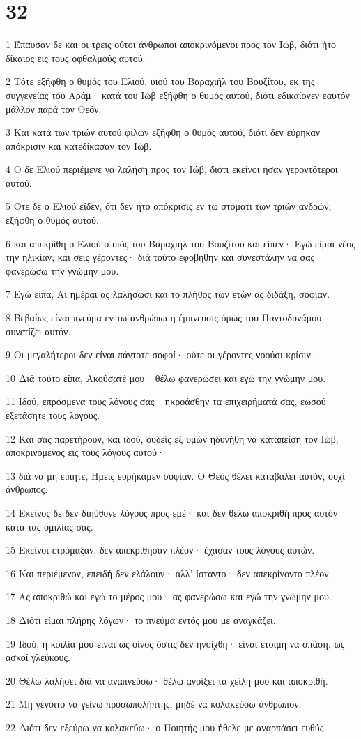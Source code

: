 \chapter{32}

\par 1 Έπαυσαν δε και οι τρεις ούτοι άνθρωποι αποκρινόμενοι προς τον Ιώβ, διότι ήτο δίκαιος εις τους οφθαλμούς αυτού.
\par 2 Τότε εξήφθη ο θυμός του Ελιού, υιού του Βαραχιήλ του Βουζίτου, εκ της συγγενείας του Αράμ· κατά του Ιώβ εξήφθη ο θυμός αυτού, διότι εδικαίονεν εαυτόν μάλλον παρά τον Θεόν.
\par 3 Και κατά των τριών αυτού φίλων εξήφθη ο θυμός αυτού, διότι δεν εύρηκαν απόκρισιν και κατεδίκασαν τον Ιώβ.
\par 4 Ο δε Ελιού περιέμενε να λαλήση προς τον Ιώβ, διότι εκείνοι ήσαν γεροντότεροι αυτού.
\par 5 Ότε δε ο Ελιού είδεν, ότι δεν ήτο απόκρισις εν τω στόματι των τριών ανδρών, εξήφθη ο θυμός αυτού.
\par 6 και απεκρίθη ο Ελιού ο υιός του Βαραχιήλ του Βουζίτου και είπεν· Εγώ είμαι νέος την ηλικίαν, και σεις γέροντες· διά τούτο εφοβήθην και συνεστάλην να σας φανερώσω την γνώμην μου.
\par 7 Εγώ είπα, Αι ημέραι ας λαλήσωσι και το πλήθος των ετών ας διδάξη, σοφίαν.
\par 8 Βεβαίως είναι πνεύμα εν τω ανθρώπω η έμπνευσις όμως του Παντοδυνάμου συνετίζει αυτόν.
\par 9 Οι μεγαλήτεροι δεν είναι πάντοτε σοφοί· ούτε οι γέροντες νοούσι κρίσιν.
\par 10 Διά τούτο είπα, Ακούσατέ μου· θέλω φανερώσει και εγώ την γνώμην μου.
\par 11 Ιδού, επρόσμενα τους λόγους σας· ηκροάσθην τα επιχειρήματά σας, εωσού εξετάσητε τους λόγους.
\par 12 Και σας παρετήρουν, και ιδού, ουδείς εξ υμών ηδυνήθη να καταπείση τον Ιώβ, αποκρινόμενος εις τους λόγους αυτού·
\par 13 διά να μη είπητε, Ημείς ευρήκαμεν σοφίαν. Ο Θεός θέλει καταβάλει αυτόν, ουχί άνθρωπος.
\par 14 Εκείνος δε δεν διηύθυνε λόγους προς εμέ· και δεν θέλω αποκριθή προς αυτόν κατά τας ομιλίας σας.
\par 15 Εκείνοι ετρόμαξαν, δεν απεκρίθησαν πλέον· έχασαν τους λόγους αυτών.
\par 16 Και περιέμενον, επειδή δεν ελάλουν· αλλ' ίσταντο· δεν απεκρίνοντο πλέον.
\par 17 Ας αποκριθώ και εγώ το μέρος μου· ας φανερώσω και εγώ την γνώμην μου.
\par 18 Διότι είμαι πλήρης λόγων· το πνεύμα εντός μου με αναγκάζει.
\par 19 Ιδού, η κοιλία μου είναι ως οίνος όστις δεν ηνοίχθη· είναι ετοίμη να σπάση, ως ασκοί γλεύκους.
\par 20 Θέλω λαλήσει διά να αναπνεύσω· θέλω ανοίξει τα χείλη μου και αποκριθή.
\par 21 Μη γένοιτο να γείνω προσωπολήπτης, μηδέ να κολακεύσω άνθρωπον.
\par 22 Διότι δεν εξεύρω να κολακεύω· ο Ποιητής μου ήθελε με αναρπάσει ευθύς.

